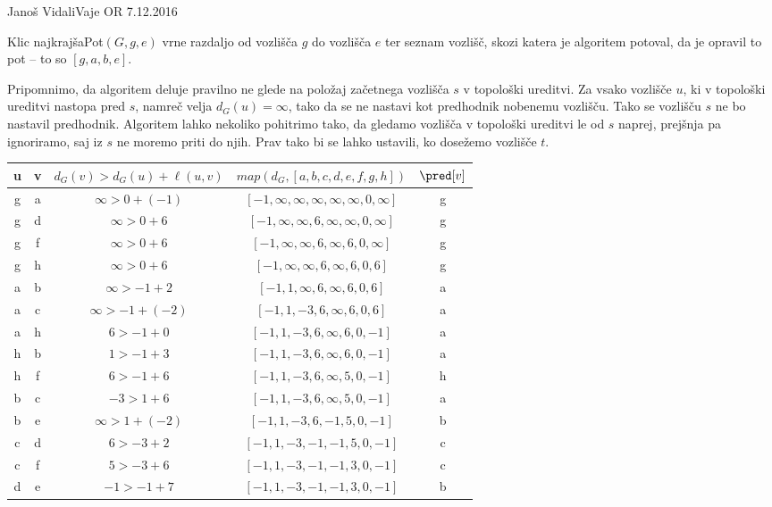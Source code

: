 \begin{naloga}{Janoš Vidali}{Vaje OR 7.12.2016}
\begin{odgovor}
\begin{enumerate}[(a)]
Klic {\sc najkrajšaPot}$(G, g, e)$
vrne razdaljo od vozlišča $g$ do vozlišča $e$
ter seznam vozlišč, skozi katera je algoritem potoval,
da je opravil to pot -- to so $[g, a, b, e]$.

Pripomnimo, da algoritem deluje pravilno
ne glede na položaj začetnega vozlišča $s$ v topološki ureditvi.
Za vsako vozlišče $u$, ki v topološki ureditvi nastopa pred $s$,
namreč velja $d_G(u) = \infty$,
tako da se ne nastavi kot predhodnik nobenemu vozlišču.
Tako se vozlišču $s$ ne bo nastavil predhodnik.
Algoritem lahko nekoliko pohitrimo tako,
da gledamo vozlišča v topološki ureditvi le od $s$ naprej,
prejšnja pa ignoriramo, saj iz $s$ ne moremo priti do njih.
Prav tako bi se lahko ustavili, ko dosežemo vozlišče $t$.

\begin{tabela}
\begin{tabular}{c|c|c|c|c}
u & v & $d_G(v) > d_G(u) + \ell(u, v)$ & $map(d_G, [a, b, c, d, e, f, g, h])$ & $\pred[v]$ \\ \hline
g & a & $\infty > 0 + (-1)$ & $[-1, \infty, \infty, \infty, \infty, \infty, 0, \infty]$ & g\\
g & d & $\infty > 0 + 6$ & $[-1, \infty, \infty, 6, \infty, \infty, 0, \infty]$ & g\\
g & f & $\infty > 0 + 6$ & $[-1, \infty, \infty, 6, \infty, 6, 0, \infty]$ & g\\
g & h & $\infty > 0 + 6$ & $[-1, \infty, \infty, 6, \infty, 6, 0, 6]$ & g\\
a & b & $\infty > -1 + 2$ & $[-1, 1, \infty, 6, \infty, 6, 0, 6]$ & a\\
a & c & $\infty > -1 + (-2)$ & $[-1, 1, -3, 6, \infty, 6, 0, 6]$ & a\\
a & h & $6 > -1 + 0$ & $[-1, 1, -3, 6, \infty, 6, 0, -1]$ & a\\
h & b & $1 > -1 + 3$ & $[-1, 1, -3, 6, \infty, 6, 0, -1]$ & a\\
h & f & $6 > -1 + 6$ & $[-1, 1, -3, 6, \infty, 5, 0, -1]$ & h\\
b & c & $-3 > 1 + 6$ & $[-1, 1, -3, 6, \infty, 5, 0, -1]$ & a\\
b & e & $\infty > 1 + (-2)$ & $[-1, 1, -3, 6, -1, 5, 0, -1]$ & b\\
c & d & $6 > -3 + 2$ & $[-1, 1, -3, -1, -1, 5, 0, -1]$ & c\\
c & f & $5 > -3 + 6$ & $[-1, 1, -3, -1, -1, 3, 0, -1]$ & c\\
d & e & $-1 > -1 + 7$ & $[-1, 1, -3, -1, -1, 3, 0, -1]$ & b\\
\end{tabular}
\end{tabela}


\end{enumerate}
\end{odgovor}
\end{naloga}
